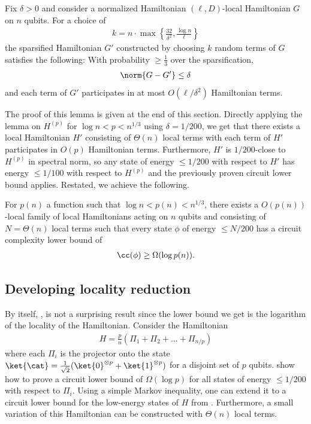 \documentclass{toc}
\begin{document}
\begin{lemma}
Fix $\delta > 0$ and consider a normalized Hamiltonian $(\ell, D)$-local Hamiltonian $G$ on $n$ qubits. For a choice of 
\begin{align}
    k = n \cdot \max \left\{ \frac{32}{\delta^2}, \frac{\log n}{\ell} \right\}
\end{align}
the sparsified Hamiltonian $G'$ constructed by choosing $k$ random terms of $G$ satisfies the following: With probability $\geq \frac{1}{3}$ over the sparsification,
\begin{align}
    \norm{G - G'} \leq \delta
\end{align}
and each term of $G'$ participates in at most $O(\ell/\delta^2)$ Hamiltonian terms.
\label{lem:sparsification}
\end{lemma}

The proof of this lemma is given at the end of this section. Directly applying the lemma on $H^{(p)}$ for $\log n < p < n^{1/3}$ using $\delta = 1/200$, we get that there exists a local Hamiltonian $H'$ consisting of $\Theta(n)$ local terms with each term of $H'$ participates in $O(p)$ Hamiltonian terms. Furthermore, $H'$ is $1/200$-close to $H^{(p)}$ in spectral norm, so any state of energy $\leq 1/200$ with respect to $H'$ has energy $\leq 1/100$ with respect to $H^{(p)}$ and the previously proven circuit lower bound applies. Restated, we achieve the following.

\begin{theorem}
For $p(n)$ a function such that $\log n < p(n) < n^{1/3}$, there exists a $O(p(n))$-local family of local Hamiltonians acting on $n$ qubits and consisting of $N = \Theta(n)$ local terms such that every state $\phi$ of energy $\leq N/200$ has a circuit complexity lower bound of
\begin{align}
    \cc(\phi) \geq \Omega(\log p(n)).
\end{align}
\label{thm:amp-restate}
\end{theorem}

\subsection{Developing locality reduction}

By itself, , is not a surprising result since the lower bound we get is the logarithm of the locality of the Hamiltonian. Consider the Hamiltonian
\begin{align}
    H = \frac{p}{n} \left(\Pi_1 + \Pi_2 + \ldots + \Pi_{n/p} \right) \label{eq:cat-counterex}
\end{align}
where each $\Pi_i$ is the projector onto the state $\ket{\cat} = \frac{1}{\sqrt{2}} (\ket{0}^{\otimes p} + \ket{1}^{\otimes p})$ for a disjoint set of $p$ qubits. \cite{nirkhe_et_al:LIPIcs:2018:9095} show how to prove a circuit lower bound of $\Omega(\log p)$ for all states of energy $\leq 1/200$ with respect to $\Pi_i$. Using a simple Markov inequality, one can extend it to a circuit lower bound for the low-energy states of $H$ from 
. Furthermore, a small variation of this Hamiltonian can be constructed with $\Theta(n)$ local terms.
\end{document}
